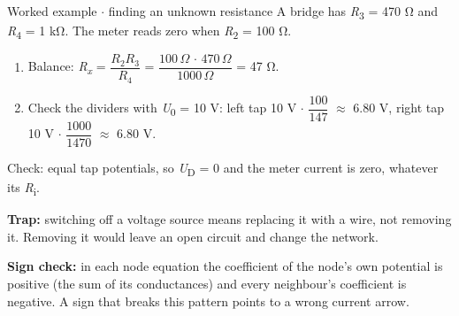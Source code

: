 \documentclass[11pt]{article}
\begin{document}
\begin{keepsection}
\begin{keepsection}
\begin{center}
\begin{minipage}[t]{0.950\linewidth}
\begin{tikzpicture}[line join=round]
\end{tikzpicture}\par{}\end{minipage}
\end{center}

\begin{workedbox}{Worked example \ensuremath{\cdot} finding an unknown resistance}
A bridge has \textit{R}\textsubscript{3} = 470 Ω and \textit{R}\textsubscript{4} = 1 kΩ. The meter reads zero when \textit{R}\textsubscript{2} = 100 Ω.

\begin{enumerate}
\item Balance: \textit{R}\textsubscript{\textit{x}} = {\small\ensuremath{\dfrac{{R}_{2}{R}_{3}}{{R}_{4}}}} = {\small\ensuremath{\dfrac{100\, Ω\, \cdot \, 470\, Ω}{1000\, Ω}}} = 47 Ω.
\item Check the dividers with \textit{U}\textsubscript{0} = 10 V: left tap 10 V \ensuremath{\cdot} {\small\ensuremath{\dfrac{100}{147}}} \ensuremath{\approx} 6.80 V, right tap 10 V \ensuremath{\cdot} {\small\ensuremath{\dfrac{1000}{1470}}} \ensuremath{\approx} 6.80 V.
\end{enumerate}

Check: equal tap potentials, so \textit{U}\textsubscript{D} = 0 and the meter current is zero, whatever its \textit{R}\textsubscript{i}.
\end{workedbox}

\begin{notebox}\textbf{Trap:} switching off a voltage source means replacing it with a wire, not removing it. Removing it would leave an open circuit and change the network.\end{notebox}

\begin{notebox}\textbf{Sign check:} in each node equation the coefficient of the node’s own potential is positive (the sum of its conductances) and every neighbour’s coefficient is negative. A sign that breaks this pattern points to a wrong current arrow.\end{notebox}


\end{keepsection}
\end{keepsection}
\end{document}
